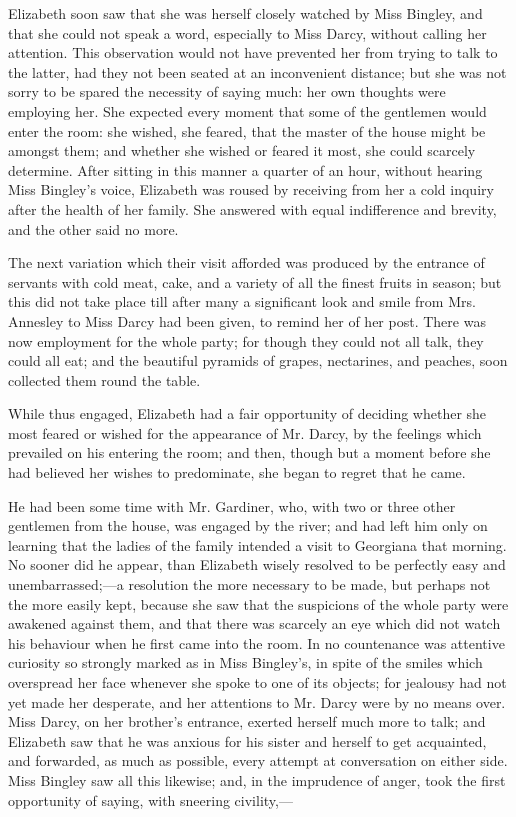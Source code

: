 \documentclass[12pt,openright]{book}
\begin{document}
Elizabeth soon saw that she was herself closely watched by Miss Bingley, and that she could not speak a word, especially to Miss Darcy, without calling her attention. This observation would not have prevented her from trying to talk to the latter, had they not been seated at an inconvenient distance; but she was not sorry to be spared the necessity of saying much: her own thoughts were employing her. She expected every moment that some of the gentlemen would enter the room: she wished, she feared, that the master of the house might be amongst them; and whether she wished or feared it most, she could scarcely determine. After sitting in this manner a quarter of an hour, without hearing Miss Bingley’s voice, Elizabeth was roused by receiving from her a cold inquiry after the health of her family. She answered with equal indifference and brevity, and the other said no more.

The next variation which their visit afforded was produced by the entrance of servants with cold meat, cake, and a variety of all the finest fruits in season; but this did not take place till after many a significant look and smile from Mrs. Annesley to Miss Darcy had been given, to remind her of her post. There was now employment for the whole party; for though they could not all talk, they could all eat; and the beautiful pyramids of grapes, nectarines, and peaches, soon collected them round the table.

While thus engaged, Elizabeth had a fair opportunity of deciding whether she most feared or wished for the appearance of Mr. Darcy, by the feelings which prevailed on his entering the room; and then, though but a moment before she had believed her wishes to predominate, she began to regret that he came.

He had been some time with Mr. Gardiner, who, with two or three other gentlemen from the house, was engaged by the river; and had left him only on learning that the ladies of the family intended a visit to Georgiana that morning. No sooner did he appear, than Elizabeth wisely resolved to be perfectly easy and unembarrassed;—a resolution the more necessary to be made, but perhaps not the more easily kept, because she saw that the suspicions of the whole party were awakened against them, and that there was scarcely an eye which did not watch his behaviour when he first came into the room. In no countenance was attentive curiosity so strongly marked as in Miss Bingley’s, in spite of the smiles which overspread her face whenever she spoke to one of its objects; for jealousy had not yet made her desperate, and her attentions to Mr. Darcy were by no means over. Miss Darcy, on her brother’s entrance, exerted herself much more to talk; and Elizabeth saw that he was anxious for his sister and herself to get acquainted, and forwarded, as much as possible, every attempt at conversation on either side. Miss Bingley saw all this likewise; and, in the imprudence of anger, took the first opportunity of saying, with sneering civility,—
\end{document}
